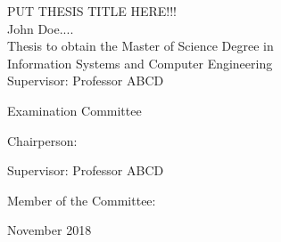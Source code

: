 \begin{center}
%
\vspace{2.5cm}

\vspace{1.0cm}
{\FontLb PUT THESIS TITLE HERE!!!} \\
\vspace{2.7cm}
{\FontMb John Doe....} \\
\vspace{2.0cm}
{\FontSn Thesis to obtain the Master of Science Degree in} \\
\vspace{0.3cm}
{\FontLb Information Systems and Computer Engineering} \\
\vspace{1.1cm}
{\FontSn %
Supervisor: Professor ABCD
}

\vspace{1.1cm}

{\FontMb Examination Committee} \\

\vspace{0.3cm}

{\FontSn %
Chairperson: 

Supervisor: Professor ABCD

Member of the Committee: 

}

\vspace{1.5cm}
{\FontMb November 2018} \\
%
\end{center}

\cleardoublepage

